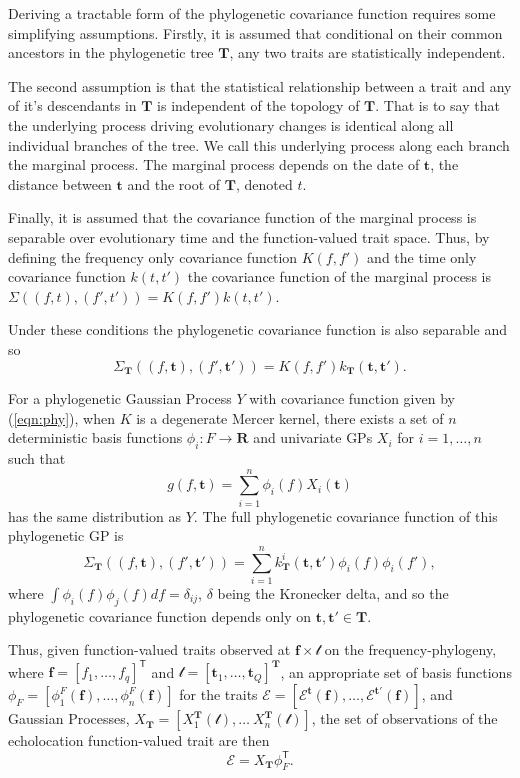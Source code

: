 \documentclass{ws-rv9x6}
\begin{document}
Deriving a tractable form of the phylogenetic covariance function requires some simplifying assumptions. Firstly, it is assumed that conditional on their common ancestors in the phylogenetic tree \(\mathbf{T}\), any two traits are statistically independent. 

The second assumption is that the statistical relationship between a trait and any of it's descendants in \(\mathbf{T}\) is independent of the topology of \(\mathbf{T}\). That is to say that the underlying process driving evolutionary changes is identical along all individual branches of the tree. We call this underlying process along each branch the marginal process. The marginal process depends on the date of \(\mathbf{t}\), the distance between \(\mathbf{t}\) and the root of \(\mathbf{T}\), denoted \(t\). 

Finally, it is assumed that the covariance function of the marginal process is separable over evolutionary time and the function-valued trait space. Thus, by defining the frequency only covariance function \(K(f,f')\) and the time only covariance function \(k(t,t')\) the covariance function of the marginal process is \(\Sigma\left((f,t), (f',t')\right) = K(f, f') k(t,t')\).

Under these conditions the phylogenetic covariance function is also separable and so
\begin{equation}
\Sigma_{\mathbf{T}}\left((f,\mathbf{t}), (f',\mathbf{t}')\right) = K(f, f') k_{\mathbf{T}}(\mathbf{t},\mathbf{t}').
\label{eqn:phy}
\end{equation}

For a phylogenetic Gaussian Process \(Y\) with covariance function given by (\ref{eqn:phy}), when \(K\) is a degenerate Mercer kernel, there exists a set of \(n\) deterministic basis functions \(\phi_i: F \to \mathbf{R}\) and univariate GPs \(X_i\) for \(i = 1,\dots, n\) such that 
\[
g(f, \mathbf{t}) = \sum_{i = 1}^{n} \phi_i(f) X_i(\mathbf{t})
\] 
has the same distribution as \(Y\). The full phylogenetic covariance function of this phylogenetic GP is
\[
\Sigma_{\mathbf{T}}((f, \mathbf{t}), (f', \mathbf{t}')) = \sum_{i = 1}^{n}  k_{\mathbf{T}}^i(\mathbf{t}, \mathbf{t}') \phi_i(f) \phi_i(f'),
\]
where \(\int \phi_i(f) \phi_j(f) df = \delta_{ij}\), \(\delta\) being the Kronecker delta, and so the phylogenetic covariance function depends only on \(\mathbf{t}, \mathbf{t}' \in \mathbf{T}\). 

Thus, given function-valued traits observed at \(\mathbf{f} \times \mathcal{t}\) on the frequency-phylogeny, where \(\mathbf{f} = [f_1, \dots, f_q]^{\mathsf{T}}\) and \(\mathcal{t} = [\mathbf{t}_1, \dots, \mathbf{t}_Q]^{\mathbf{T}}\), an appropriate set of basis functions \(\phi_{F} = [\phi^{F}_1(\mathbf{f}), \dots, \phi^{F}_n(\mathbf{f})]\) for the traits \(\mathcal{E} = [\mathcal{E}^{\mathbf{t}}(\mathbf{f}), \dots, \mathcal{E}^{\mathbf{t}'}(\mathbf{f})]\), and Gaussian Processes, \(X_{\mathbf{T}} = [X_1^{\mathbf{T}}(\mathcal{t}), \dots\ X_n^{\mathbf{T}}(\mathcal{t})]\), the set of observations of the echolocation function-valued trait are then 
\begin{equation}
\mathcal{E} = X_{\mathbf{T}} \phi_F^{\mathsf{T}}.
\label{eqn:inv}
\end{equation}
\end{document}
